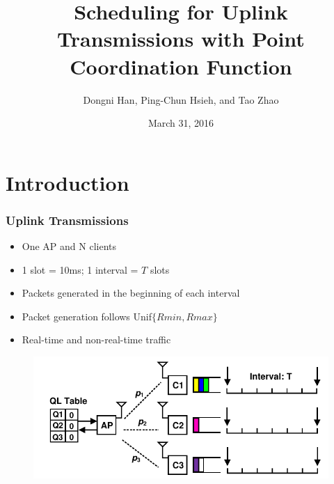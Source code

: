 \documentclass{beamer}
\begin{document}
\title{Scheduling for Uplink Transmissions with Point Coordination Function}
\author{Dongni Han, Ping-Chun Hsieh, and Tao Zhao}
\date{March 31, 2016}
\newtheorem{thm}{Theorem} 
\begin{frame}
\titlepage
\end{frame}





\section{Introduction}

\begin{frame}
\frametitle{Uplink Transmissions}
\begin{itemize}
\item One AP and N clients
\item 1 slot = 10ms; 1 interval = $T$ slots
\item Packets generated in the beginning of each interval
\item Packet generation follows Unif$\{Rmin, Rmax\}$
\item Real-time and non-real-time traffic
\end{itemize}
\begin{figure}
\centering
\includegraphics[scale=0.8]{network.pdf}
\end{figure}
\end{frame}
\end{document}
